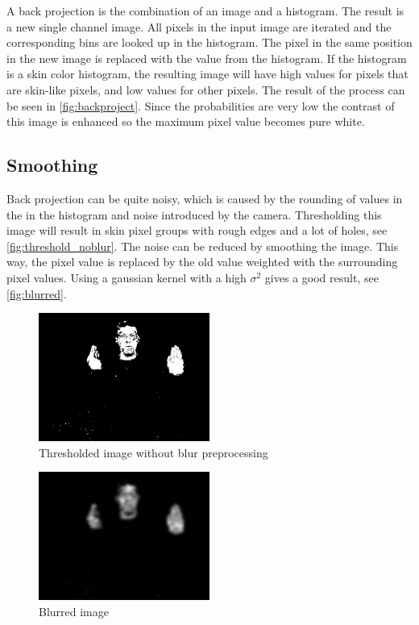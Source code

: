 A back projection is the combination of an image and a histogram. The result is a new single channel image. All pixels in the input image are iterated and the corresponding bins are looked up in the histogram. The pixel in the same position in the new image is replaced with the value from the histogram. If the histogram is a skin color histogram, the resulting image will have high values for pixels that are skin-like pixels, and low values for other pixels. The result of the process can be seen in \autoref{fig:backproject}. Since the probabilities are very low the contrast of this image is enhanced so the maximum pixel value becomes pure white.


\subsection*{Smoothing}
Back projection can be quite noisy, which is caused by the rounding of values in the in the histogram and noise introduced by the camera. Thresholding this image will result in skin pixel groups with rough edges and a lot of holes, see \autoref{fig:threshold_noblur}. The noise can be reduced by smoothing the image. This way, the pixel value is replaced by the old value weighted with the surrounding pixel values. Using a gaussian kernel with a high $\sigma^2$ gives a good result, see \autoref{fig:blurred}.

\begin{figure}[tb]
    \center{}
 \includegraphics[width=0.5\textwidth]{figures/pipeline/thresholded_noblur.jpg}
	\caption{Thresholded image without blur preprocessing}
	\label{fig:threshold_noblur}
\end{figure}

\begin{figure}[tb]
    \center{}
    \includegraphics[width=0.5\textwidth]{figures/pipeline/blurred.jpg}
	\caption{Blurred image}
	\label{fig:blurred}
\end{figure}


